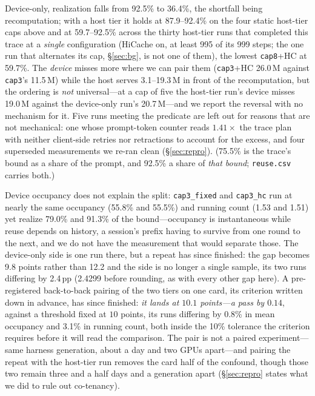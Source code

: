 Device-only, realization falls from 92.5\% to 36.4\%, the shortfall being
recomputation; with a host tier it holds at 87.9--92.4\% on the four static
host-tier caps above and at 59.7--92.5\% across the thirty host-tier runs
that completed this trace at a \emph{single} configuration (HiCache on, at least
995 of its 999 steps; the one run that alternates its cap, \S\ref{sec:bg}, is not
one of them), the lowest \texttt{cap8}+HC at 59.7\%. The \emph{device} misses more
where we can pair them (\texttt{cap3}+HC 26.0\,M against \texttt{cap3}'s
11.5\,M) while the host serves 3.1--19.3\,M in front of the recomputation, but the
ordering is \emph{not} universal---at a cap of five the host-tier run's device
misses 19.0\,M against the device-only run's 20.7\,M---and we report the reversal
with no mechanism for it. Five runs meeting the predicate are left out for reasons
that are not mechanical: one whose prompt-token counter reads $1.41\times$ the
trace plan with neither client-side retries nor retractions to account for the
excess, and four superseded measurements we re-ran clean (\S\ref{sec:repro}).
(75.5\% is the trace's bound as a share of the prompt, and 92.5\% a share of
\emph{that bound}; \texttt{reuse.csv} carries both.)

Device occupancy does not explain the split: \texttt{cap3\_fixed} and
\texttt{cap3\_hc} run at nearly the same occupancy (55.8\% and 55.5\%) and running
count (1.53 and 1.51) yet realize 79.0\% and 91.3\% of the bound---occupancy is
instantaneous while reuse depends on history, a session's prefix having to survive
from one round to the next, and we do not have the measurement that would separate
those. The device-only side is one run there, but a repeat has since finished: the
gap becomes 9.8 points rather than 12.2 and the side is no longer a single sample,
its two runs differing by 2.4\,pp (2.4299 before rounding, as with every other gap
here). A pre-registered back-to-back pairing of the two tiers on one card, its
criterion written down in advance, has since finished: \emph{it lands at $10.1$
points---a pass by $0.14$}, against a threshold fixed at $10$ points, its runs
differing by 0.8\% in mean occupancy and 3.1\% in running count, both inside the
10\% tolerance the criterion requires before it will read the comparison. The pair
is not a paired experiment---same
harness generation, about a day and two GPUs apart---and pairing the repeat with
the host-tier run removes the card half of the confound, though those two remain
three and a half days and a generation apart (\S\ref{sec:repro} states what we did
to rule out co-tenancy).

